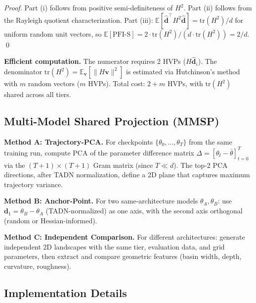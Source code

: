 \documentclass{article}
\begin{document}
\emph{Proof.} Part (i) follows from positive semi-definiteness of $H^2$. Part (ii) follows from the Rayleigh quotient characterization. Part (iii): $\mathbb{E}[\hat{\mathbf{d}}^\top H^2 \hat{\mathbf{d}}] = \mathrm{tr}(H^2)/d$ for uniform random unit vectors, so $\mathbb{E}[\mathrm{PFI\text{-}S}] = 2 \cdot \mathrm{tr}(H^2) / (d \cdot \mathrm{tr}(H^2)) = 2/d$. \qed

\textbf{Efficient computation.} The numerator requires 2 HVPs ($H\hat{\mathbf{d}}_i$). The denominator $\mathrm{tr}(H^2) = \mathbb{E}_{\mathbf{v}}[\|H\mathbf{v}\|^2]$ is estimated via Hutchinson's method~\citep{hutchinson1990stochastic} with $m$ random vectors ($m$ HVPs). Total cost: $2 + m$ HVPs, with $\mathrm{tr}(H^2)$ shared across all tiers.

\subsection{Multi-Model Shared Projection (MMSP)}
\label{sec:mmsp}

\textbf{Method A: Trajectory-PCA.} For checkpoints $\{\theta_0, \ldots, \theta_T\}$ from the same training run, compute PCA of the parameter difference matrix $\Delta = [\theta_t - \bar{\theta}]_{t=0}^T$ via the $(T\!+\!1) \times (T\!+\!1)$ Gram matrix (since $T \ll d$). The top-2 PCA directions, after TADN normalization, define a 2D plane that captures maximum trajectory variance.

\textbf{Method B: Anchor-Point.} For two same-architecture models $\theta_A, \theta_B$: use $\mathbf{d}_1 = \theta_B - \theta_A$ (TADN-normalized) as one axis, with the second axis orthogonal (random or Hessian-informed).

\textbf{Method C: Independent Comparison.} For different architectures: generate independent 2D landscapes with the same tier, evaluation data, and grid parameters, then extract and compare geometric features (basin width, depth, curvature, roughness).

\subsection{Implementation Details}
\label{sec:implementation}
\end{document}
